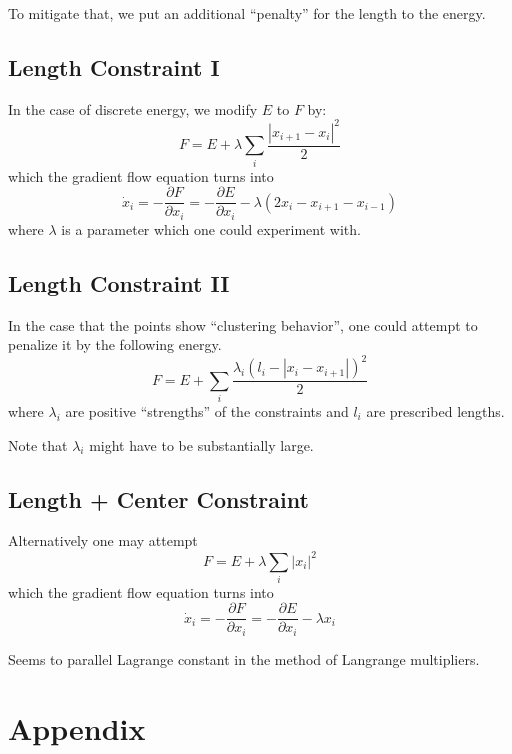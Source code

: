 \documentclass[a4paper, 11pt]{article}
\theoremstyle{definition}
\theoremstyle{remark}
\begin{document}
To mitigate that, we put an additional ``penalty'' for the length to the energy.
\subsection{Length Constraint I}
In the case of discrete energy, we modify $E$ to $F$ by:
\begin{equation}
    F = E + \lambda \sum_i \frac{|x_{i+1} - x_i|^2}{2}
\end{equation}
which the gradient flow equation turns into
\begin{equation}
    \dot{x}_i = - \frac{\partial F}{\partial x_i} =  - \frac{\partial E}{\partial x_i} - \lambda \left( 2 x_i - x_{i+1} - x_{i-1} \right)
\end{equation}
where $\lambda$ is a parameter which one could experiment with.

\subsection{Length Constraint II}
In the case that the points show ``clustering behavior'', one could attempt to penalize it by the following energy.
\begin{equation}
    F = E + \sum_i \frac{\lambda_i \left( l_i - |x_i - x_{i+1}| \right)^2}{2}
\end{equation}
where $\lambda_i$ are positive ``strengths'' of the constraints and $l_i$ are prescribed lengths.

Note that $\lambda_i$ might have to be substantially large.


\subsection{Length + Center Constraint}
Alternatively one may attempt
\begin{equation}
    F = E + \lambda \sum_i |x_i|^2
\end{equation}
which the gradient flow equation turns into
\begin{equation}
    \dot{x}_i = - \frac{\partial F}{\partial x_i} =  - \frac{\partial E}{\partial x_i} - \lambda x_i
\end{equation}



Seems to parallel Lagrange constant in the method of Langrange multipliers.
\section{Appendix}
\end{document}
